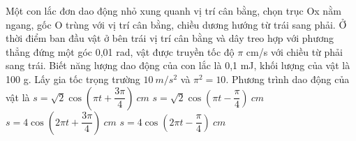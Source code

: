\begin{vidu} %
Một con lắc đơn dao động nhỏ xung quanh vị trí cân bằng, chọn trục Ox nằm ngang, gốc O trùng với vị trí cân bằng, chiều dương hướng từ trái sang phải. Ở thời điểm ban đầu vật ở bên trái vị trí cân bằng và dây treo hợp với phương thẳng đứng một góc 0,01 rad, vật được truyền tốc độ $\pi$ cm/s với chiều từ phải sang trái. Biết năng lượng dao động của con lắc là 0,1 mJ, khối lượng của vật là 100 g. Lấy gia tốc trọng trường $10\ m/s^2$ và $\pi^2 = 10$. Phương trình dao động của vật là
\choice
{\True $s=\sqrt{2}\cos \left(\pi t+\dfrac{3\pi}{4}\right)\ cm$}
{$s=\sqrt{2}\cos \left(\pi t-\dfrac{\pi}{4}\right)\ cm$}
{$s=4\cos \left(2\pi t+\dfrac{3\pi}{4}\right)\ cm$}
{$s=4\cos \left(2\pi t-\dfrac{\pi}{4}\right)\ cm$}

\end{vidu} %

